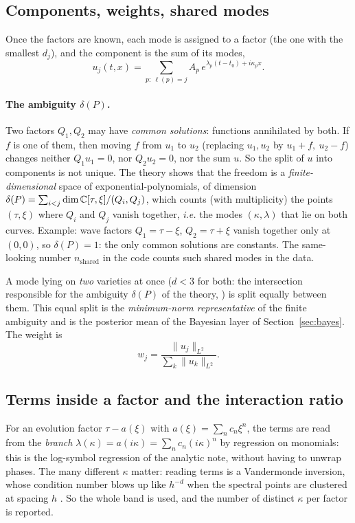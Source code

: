 \subsection{Components, weights, shared modes}
Once the factors are known, each mode is assigned to a factor (the one with the smallest $d_j$), and the component is the sum of its modes,
\[
u_j(t,x)=\sum_{p:\ \ell(p)=j}A_p\,e^{\lambda_p(t-t_0)+i\kappa_px}.
\]
\paragraph{The ambiguity $\delta(P)$.} Two factors $Q_1,Q_2$ may have \emph{common solutions}: functions annihilated by both. If $f$ is one of them, then moving $f$ from $u_1$ to $u_2$ (replacing $u_1,u_2$ by $u_1+f,\ u_2-f$) changes neither $Q_1u_1=0$, nor $Q_2u_2=0$, nor the sum $u$. So the split of $u$ into components is not unique. The theory shows that the freedom is a \emph{finite-dimensional} space of exponential-polynomials, of dimension $\delta(P)=\sum_{i<j}\dim\mathbb{C}[\tau,\xi]/(Q_i,Q_j)$, which counts (with multiplicity) the points $(\tau,\xi)$ where $Q_i$ and $Q_j$ vanish together, \emph{i.e.} the modes $(\kappa,\lambda)$ that lie on both curves. Example: wave factors $Q_1=\tau-\xi$, $Q_2=\tau+\xi$ vanish together only at $(0,0)$, so $\delta(P)=1$: the only common solutions are constants. The same-looking number $n_{\mathrm{shared}}$ in the code counts such shared modes in the data.

A mode lying on \emph{two} varieties at once ($d<3$ for both: the intersection responsible for the ambiguity $\delta(P)$ of the theory, ) is split equally between them. This equal split is the \emph{minimum-norm representative} of the finite ambiguity and is the posterior mean of the Bayesian layer of Section~\ref{sec:bayes}. The weight is
\begin{equation}\label{eq:wj}
w_j=\frac{\|u_j\|_{L^2}}{\sum_k\|u_k\|_{L^2}}.
\end{equation}

\subsection{Terms inside a factor and the interaction ratio}
For an evolution factor $\tau-a(\xi)$ with $a(\xi)=\sum_nc_n\xi^n$, the terms are read from the \emph{branch} $\lambda(\kappa)=a(i\kappa)=\sum_nc_n(i\kappa)^n$ by regression on monomials: this is the log-symbol regression of the analytic note, without having to unwrap phases. The many different $\kappa$ matter: reading terms is a Vandermonde inversion, whose condition number blows up like $h^{-d}$ when the spectral points are clustered at spacing $h$ . So the whole band is used, and the number of distinct $\kappa$ per factor is reported.


